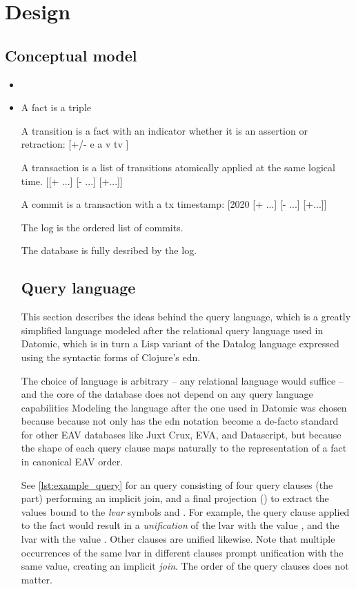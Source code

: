\section{Design}\label{sec:design}







\subsection{Conceptual model}



\begin{itemize}
  \item
  \item A fact is a triple \lisp{[e a v]}

A transition is a fact with an indicator whether it is an assertion or retraction: [+/- e a v tv ]

A transaction is a list of transitions atomically applied at the same logical time. [[+ ...] [- ...] [+...]]

A commit is a transaction with a tx timestamp: [2020 [+ ...] [- ...] [+...]]

The log is the ordered list of commits.

The database is fully desribed by the log.




\subsection{Query language}

This section describes the ideas behind the query language, which is a greatly simplified language modeled after the relational query language used in Datomic, which is in turn a Lisp variant of the Datalog \cite{abiteboul1988datalog} language expressed using the syntactic forms of Clojure's \gls{edn}.

The choice of language is arbitrary -- any relational language would suffice -- and the core of the database does not depend on any query language capabilities Modeling the language after the one used in Datomic was chosen because because not only has the edn notation become a de-facto standard for other EAV databases like Juxt Crux, EVA, and Datascript, but because the shape of each query clause maps naturally to the representation of a fact in canonical EAV order.

See \autoref{lst:example_query} for an query consisting of four query clauses (the  part) performing an implicit join, and a final projection () to extract the values bound to the \emph{\gls{lvar}} symbols  and . For example, the query clause  applied to the fact  would result in a \emph{unification} of the lvar  with the value , and the lvar  with the value . Other clauses are unified likewise. Note that multiple occurrences of the same lvar in different clauses prompt unification with the same value, creating an implicit \emph{join}. The order of the query clauses does not matter.


\end{itemize}
